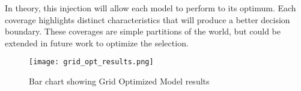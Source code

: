 \par
In theory, this injection will allow each model to perform to its optimum.
Each coverage highlights distinct characteristics that will produce a better decision boundary.
These coverages are simple partitions of the world, but could be extended in future work to optimize the selection.

\begin{figure}[h]
    \centering
    \texttt{[image: grid\_opt\_results.png]}
    \caption{Bar chart showing Grid Optimized Model results}
    \label{fig:grid_opt_barplot}
\end{figure}


